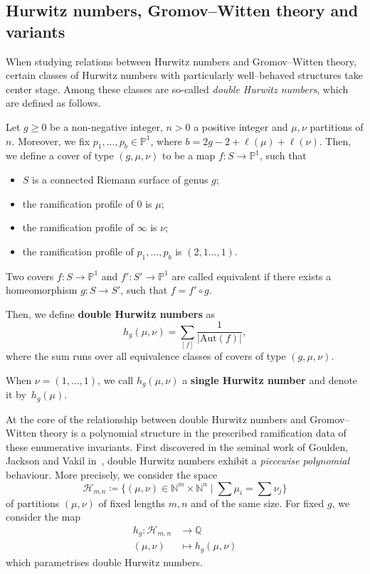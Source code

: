 \documentclass[ALCO,published]{cedram}
\begin{document}
\subsection{Hurwitz numbers, Gromov--Witten theory and variants}
When studying relations between Hurwitz numbers and Gromov--Witten theory, certain classes of Hurwitz numbers with particularly well--behaved structures take center stage. Among these classes are so-called \textit{double Hurwitz numbers}, which are defined as follows.

\begin{defi}\label{def-hur}
Let $g\ge0$ be a non-negative integer, $n>0$ a positive integer and $\mu,\nu$ partitions of $n$. Moreover, we fix $p_1,\dots,p_b\in\mathbb{P}^1$, where $b=2g-2+\ell(\mu)+\ell(\nu)$. Then, we define a cover of type $(g,\mu,\nu)$ to be a map $f\colon S\to\mathbb{P}^1$, such that
\begin{itemize}
    \item $S$ is a connected Riemann surface of genus $g$;
    \item the ramification profile of $0$ is $\mu$;
    \item the ramification profile of $\infty$ is $\nu$;
    \item the ramification profile of $p_1,\dots,p_b$ is $(2,1\dots,1)$.
\end{itemize}
Two covers $f\colon S\to\mathbb{P}^1$ and $f'\colon S'\to\mathbb{P}^1$ are called equivalent if there exists a homeomorphism $g\colon S\to S'$, such that $f= f'\circ g$.

Then, we define \textbf{double Hurwitz numbers} as
\begin{equation*}
    h_g(\mu,\nu)=\sum_{[f]}\frac{1}{|\mathrm{Aut}(f)|},
\end{equation*}
where the sum runs over all equivalence classes of covers of type $(g,\mu,\nu)$.

When $\nu=(1,\dots,1)$, we call $h_g(\mu,\nu)$ a \textbf{single Hurwitz number} and denote it by~$h_g(\mu)$.
\end{defi}

At the core of the relationship between double Hurwitz numbers and Gromov--Witten theory is a polynomial structure in the prescribed ramification data of these enumerative invariants. First discovered in the seminal work of Goulden, Jackson and Vakil in~\cite{GJV05}, double Hurwitz numbers exhibit a \textit{piecewise polynomial} behaviour. More precisely, we consider the space \begin{equation*}
    \mathcal{H}_{m.n}\coloneqq\{(\mu,\nu)\in\mathbb{N}^m\times\mathbb{N}^n\mid \sum \mu_i=\sum \nu_j\}
\end{equation*}
of partitions $(\mu,\nu)$ of fixed lengths $m,n$ and of the same size. For fixed $g$, we consider the map
\begin{align*}
    h_g\colon \mathcal{H}_{m,n}&\to\mathbb{Q}\\
    (\mu,\nu)&\mapsto h_g(\mu,\nu)
\end{align*}
which parametrises double Hurwitz numbers.
\end{document}
